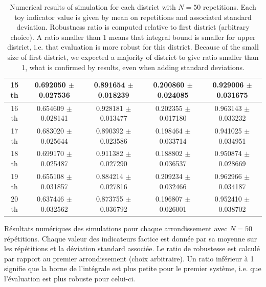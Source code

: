 \begin{table}[h!]
\begin{tabular}[6pt]{c|c|c|c|c}
\hline
15 th & 0.692050 $\pm$ 0.027536 & 0.891654 $\pm$ 0.018239 & 0.200860 $\pm$ 0.024085 & 0.929006 $\pm$ 0.031675\\[3pt]
\hline
16 th & 0.654609 $\pm$ 0.028141 & 0.928181 $\pm$ 0.013477 & 0.202355 $\pm$ 0.017180 & 0.963143 $\pm$ 0.033232\\[3pt]
\hline
17 th & 0.683020 $\pm$ 0.025644 & 0.890392 $\pm$ 0.023586 & 0.198464 $\pm$ 0.033714 & 0.941025 $\pm$ 0.034951\\[3pt]
\hline
18 th & 0.699170 $\pm$ 0.025487 & 0.911382 $\pm$ 0.027290 & 0.188802 $\pm$ 0.036537 & 0.950874 $\pm$ 0.028669\\[3pt]
\hline
19 th & 0.655108 $\pm$ 0.031857 & 0.884214 $\pm$ 0.027816 & 0.209234 $\pm$ 0.032466 & 0.962966 $\pm$ 0.034187\\[3pt]
\hline
20 th & 0.637446 $\pm$ 0.032562 & 0.873755 $\pm$ 0.036792 & 0.196807 $\pm$ 0.026001 & 0.952410 $\pm$ 0.038702\\[3pt]
\hline
\end{tabular}

\bigskip

\caption{Numerical results of simulation for each district with $N=50$ repetitions. Each toy indicator value is given by mean on repetitions and associated standard deviation. Robustness ratio is computed relative to first district (arbitrary choice). A ratio smaller than 1 means that integral bound is smaller for upper district, i.e. that evaluation is more robust for this district. Because of the small size of first district, we expected a majority of district to give ratio smaller than 1, what is confirmed by results, even when adding standard deviations.}{Résultats numériques des simulations pour chaque arrondissement avec $N=50$ répétitions. Chaque valeur des indicateurs factice est donnée par sa moyenne sur les répétitions et la déviation standard associée. Le ratio de robustesse est calculé par rapport au premier arrondissement (choix arbitraire). Un ratio inférieur à 1 signifie que la borne de l'intégrale est plus petite pour le premier système, i.e. que l'évaluation est plus robuste pour celui-ci.}


\end{table}



